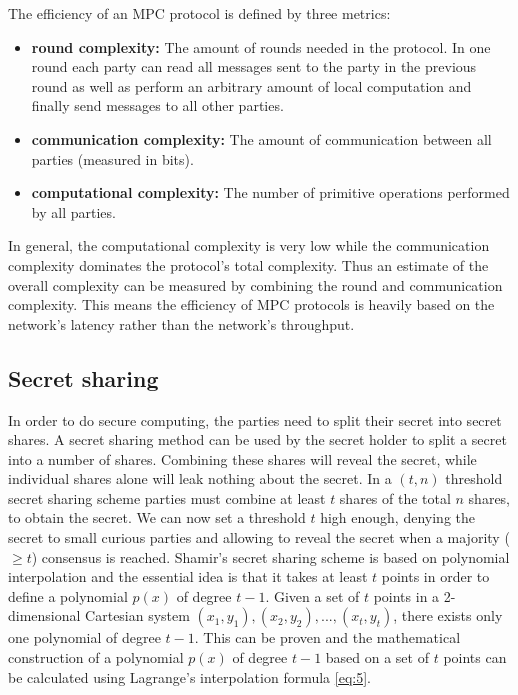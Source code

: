 The efficiency of an MPC protocol is defined by three metrics:
\begin{itemize}
  \item \textbf{round complexity:} The amount of rounds needed in the protocol. In one round each party can read all messages sent to the party in the previous round as well as perform an arbitrary amount of local computation and finally send messages to all other parties.
  \item \textbf{communication complexity:} The amount of communication between all parties (measured in bits).
  \item \textbf{computational complexity:} The number of primitive operations performed by all parties.
\end{itemize}
In general, the computational complexity is very low while the communication complexity dominates the protocol's total complexity. Thus an estimate of the overall complexity can be measured by combining the round and communication complexity. This means the efficiency of MPC protocols  is heavily based on the network's latency rather than the network's throughput.

\subsection{Secret sharing}
\label{Secret sharing}
In order to do secure computing, the parties need to split their secret into secret shares. A secret sharing method can be used by the secret holder to split a secret into a number of shares. Combining these shares will reveal the secret, while individual shares alone will leak nothing about the secret. In a $(t,n)$ threshold secret sharing scheme parties must combine at least $t$ shares of the total $n$ shares, to obtain the secret. We can now set a threshold $t$ high enough, denying the secret to small curious parties and allowing to reveal the secret when a majority ($\geq t$) consensus is reached. Shamir's secret sharing scheme \cite{shamir1979share} is based on polynomial interpolation and the essential idea is that it takes at least $t$ points in order to define a polynomial $p(x)$ of degree $t-1$. Given a set of $t$ points in a 2-dimensional Cartesian system  $(x_1, y_1), (x_2, y_2), ..., (x_t,y_t)$, there exists only one polynomial of degree $t-1$. This can be proven and the mathematical construction of a polynomial $p(x)$ of degree $t-1$ based on a set of $t$ points can be calculated using Lagrange's interpolation formula \ref{eq:5}.

